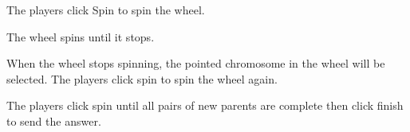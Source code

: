 \documentclass[12pt,oneside,openright,a4paper]{cpe-english-project}
\begin{document}
\begin{itemize}
\begin{enumerate}
		The players click Spin to spin the wheel. \\
		\begin{minipage}[c]{\textwidth}\centering {}  \end{minipage}
		The wheel spins until it stops. \\
		\begin{minipage}[c]{\textwidth}\centering {}  \end{minipage}
		When the wheel stops spinning, the pointed chromosome in the wheel will be selected. The players click spin to spin the wheel again. \\
		\begin{minipage}[c]{\textwidth}\centering {}  \end{minipage}
		The players click spin until all pairs of new parents are complete then click finish to send the answer. \\


\end{enumerate}
\end{itemize}
\end{document}
